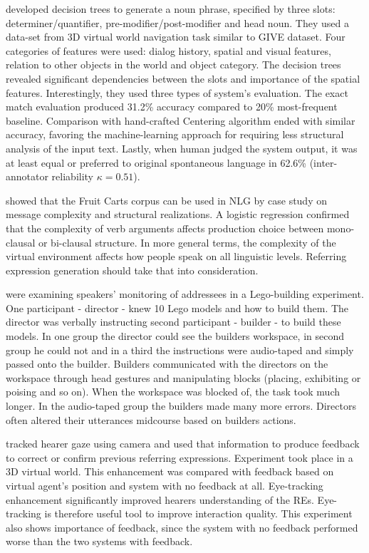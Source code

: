 \citet{stoia2006noun} developed decision trees to generate a noun phrase, specified by three slots: determiner/quantifier, pre-modifier/post-modifier and head noun. They used a data-set from 3D virtual world navigation task similar to GIVE dataset. Four categories of features were used: dialog history, spatial and visual features, relation to other objects in the world and object category. The decision trees revealed significant dependencies between the slots and importance of the spatial features. Interestingly, they used three types of system's evaluation. The exact match evaluation produced 31.2\% accuracy compared to 20\% most-frequent baseline. Comparison with hand-crafted Centering algorithm \citep{kibble2000integrated} ended with similar accuracy, favoring the machine-learning approach for requiring less structural analysis of the input text. Lastly, when human judged the system output, it was at least equal or preferred to original spontaneous language in 62.6\% (inter-annotator reliability $\kappa = 0.51$).

\citet{gallo2008production} showed that the Fruit Carts corpus can be used in NLG by case study on message complexity and structural realizations. A logistic regression confirmed that the complexity of verb arguments affects production choice between mono-clausal or bi-clausal structure. In more general terms, the complexity of the virtual environment affects how people speak on all linguistic levels. Referring expression generation should take that into consideration.

\citet{clark2004speaking} were examining speakers' monitoring of addressees in a Lego-building experiment. One participant - director - knew 10 Lego models and how to build them. The director was verbally instructing second participant - builder - to build these models. In one group the director could see the builders workspace, in second group he could not and in a third the instructions were audio-taped and simply passed onto the builder. Builders communicated with the directors on the workspace through head gestures and manipulating blocks (placing, exhibiting or poising and so on). When the workspace was blocked of, the task took much longer. In the audio-taped group the builders made many more errors. Directors often altered their utterances midcourse based on builders actions.

\citet{koller2012enhancing} tracked hearer gaze using camera and used that information to produce feedback to correct or confirm previous referring expressions. Experiment took place in a 3D virtual world. This enhancement was compared with feedback based on virtual agent's position and system with no feedback at all. Eye-tracking enhancement significantly improved hearers understanding of the REs. Eye-tracking is therefore useful tool to improve interaction quality. This experiment also shows importance of feedback, since the system with no feedback performed worse than the two systems with feedback.